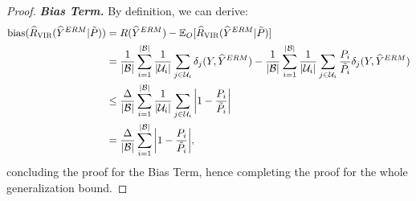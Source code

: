 \begin{proof}
\textbf{\emph{Bias Term.}} By definition, we can derive:
%
\begin{align*}
    \textrm{bias} (\hat{R}_{\textsc{VIR}} (\hat{Y}^{ERM} | \Tilde{P})) &= R (\hat{Y}^{ERM}) - \mathbb{E}_{O} [\hat{R}_{\textsc{VIR}} (\hat{Y}^{ERM} | \Tilde{P})] \\
    &= \dfrac{1}{|\mathcal{B}|} \sum_{i=1}^{|\mathcal{B}|} \dfrac{1}{|\mathcal{U}_{i}|} \sum_{j \in \mathcal{U}_{i}} \delta_{j} (Y, \hat{Y}^{ERM}) - \dfrac{1}{|\mathcal{B}|} \sum_{i=1}^{|\mathcal{B}|} \dfrac{1}{|\mathcal{U}_{i}|} \sum_{j \in \mathcal{U}_{i}} \dfrac{P_{i}}{\Tilde{P}_{i}} \delta_{j} (Y, \hat{Y}^{ERM}) \\
    &\leq \dfrac{\Delta}{|\mathcal{B}|} \sum_{i=1}^{|\mathcal{B}|} \dfrac{1}{|\mathcal{U}_{i}|} \sum_{j \in \mathcal{U}_{i}} \bigg| 1 - \dfrac{P_{i}}{\Tilde{P}_{i}} \bigg| \\
    &= \dfrac{\Delta}{|\mathcal{B}|} \sum_{i=1}^{|\mathcal{B}|} \bigg| 1 - \dfrac{P_{i}}{\Tilde{P}_{i}} \bigg|,
\end{align*}
%
concluding the proof for the Bias Term, hence completing the proof for the whole generalization bound. 
\end{proof}




